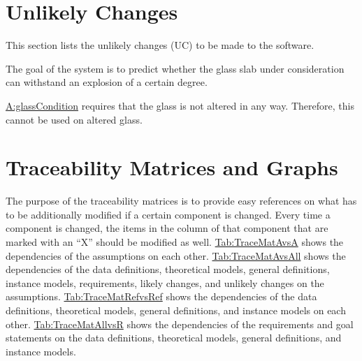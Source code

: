 \documentclass[12pt]{article}
\begin{document}
\section{Unlikely Changes}
\label{Sec:UCs}
This section lists the unlikely changes (UC) to be made to the software.

\begin{description}[font=\normalfont]
\item[Predict-Withstanding-of-Certain-Degree:\phantomsection\label{predictWithstandOfCertDeg}]{The goal of the system is to predict whether the glass slab under consideration can withstand an explosion of a certain degree.}
\item[Accommodate-Altered-Glass:\phantomsection\label{accAlteredGlass}]{\hyperref[assumpGC]{A:glassCondition} requires that the glass is not altered in any way. Therefore, this cannot be used on altered glass.}
\end{description}
\section{Traceability Matrices and Graphs}
\label{Sec:TraceMatrices}
The purpose of the traceability matrices is to provide easy references on what has to be additionally modified if a certain component is changed. Every time a component is changed, the items in the column of that component that are marked with an ``X'' should be modified as well. \hyperref[Table:TraceMatAvsA]{Tab:TraceMatAvsA} shows the dependencies of the assumptions on each other. \hyperref[Table:TraceMatAvsAll]{Tab:TraceMatAvsAll} shows the dependencies of the data definitions, theoretical models, general definitions, instance models, requirements, likely changes, and unlikely changes on the assumptions. \hyperref[Table:TraceMatRefvsRef]{Tab:TraceMatRefvsRef} shows the dependencies of the data definitions, theoretical models, general definitions, and instance models on each other. \hyperref[Table:TraceMatAllvsR]{Tab:TraceMatAllvsR} shows the dependencies of the requirements and goal statements on the data definitions, theoretical models, general definitions, and instance models.
\end{document}
